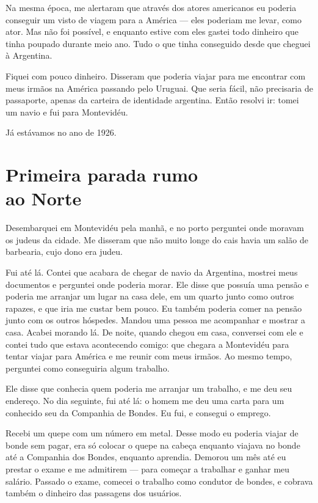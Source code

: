 Na mesma época, me alertaram que através dos atores americanos 
eu poderia conseguir um visto de viagem para a América --- eles poderiam me levar, como ator. Mas não foi possível, e
enquanto estive com eles gastei todo dinheiro que tinha poupado
durante meio ano. Tudo o que tinha conseguido desde que cheguei à Argentina.

Fiquei com pouco dinheiro. Disseram que poderia viajar
para me encontrar com meus irmãos na América passando pelo Uruguai.
Que seria fácil, não precisaria de passaporte, apenas da
carteira de identidade argentina. Então resolvi ir: tomei um navio e fui
para Montevidéu.

Já estávamos no ano de 1926.


\chapter*{Primeira parada rumo\\ao Norte}

Desembarquei em Montevidéu pela manhã, e no porto perguntei 
onde moravam os judeus da cidade. Me disseram que não muito
longe do cais havia um salão de barbearia, cujo dono era judeu.

Fui até lá. Contei que acabara de chegar de navio da Argentina, mostrei
meus documentos e perguntei onde poderia morar. Ele disse que possuía
uma pensão e poderia me arranjar um lugar na casa dele, em um
quarto junto como outros rapazes, e que iria me custar bem pouco. Eu
 também poderia comer na pensão junto com os outros hóspedes. Mandou uma
pessoa me acompanhar e mostrar a casa. Acabei morando lá. De noite,
quando chegou em casa, conversei com ele e contei tudo que estava
acontecendo comigo: que chegara a Montevidéu para tentar
viajar para América e me reunir com meus irmãos. Ao mesmo tempo,
perguntei como conseguiria algum trabalho.

Ele disse que conhecia quem poderia me arranjar um trabalho, e me deu seu
endereço. No dia seguinte, fui até lá: o homem me deu uma carta para um
conhecido seu da Companhia de Bondes. Eu fui, e consegui o emprego.

Recebi um quepe com um número em metal. Desse modo eu poderia viajar de
bonde sem pagar, era só colocar o quepe na cabeça enquanto viajava no
bonde até a Companhia dos Bondes, enquanto aprendia. Demorou um mês 
até eu prestar o exame e me admitirem --- para começar a trabalhar e ganhar 
meu salário. Passado o exame, comecei o trabalho 
como condutor de bondes, e cobrava também o dinheiro das passagens dos usuários.

